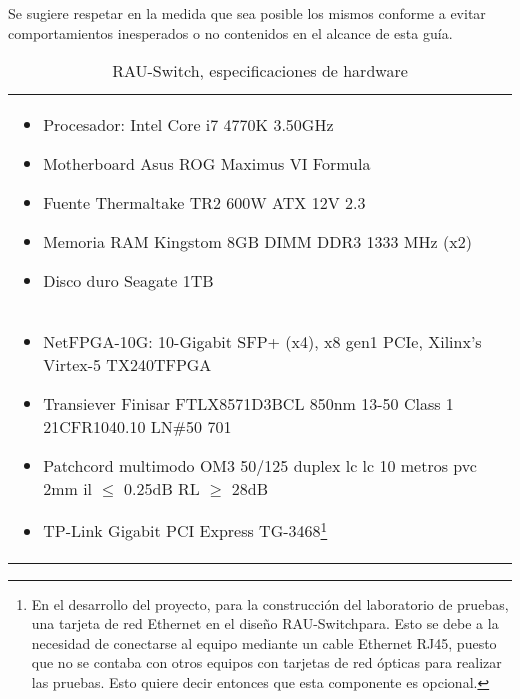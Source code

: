 Se sugiere respetar en la medida que sea posible los mismos conforme a evitar comportamientos inesperados o no contenidos en el alcance de esta guía.\\

\begin{table}[h]\centering
\begin{tabularx}{\textwidth}{|>{\setlength\hsize{1.0\hsize}\setlength\linewidth{\hsize}}X|}
\hline
\multicolumn{1}{|c|}{Hardware}\\
\hline
\begin{itemize}
\item Procesador: Intel Core i7 4770K 3.50GHz
\item Motherboard Asus ROG Maximus VI Formula
\item Fuente Thermaltake TR2 600W ATX 12V 2.3
\item Memoria RAM Kingstom 8GB DIMM DDR3 1333 MHz (x2)
\item Disco duro Seagate 1TB
\end{itemize}\\

\begin{itemize}
\item NetFPGA-10G: 10-Gigabit SFP+ (x4), x8 gen1 PCIe, Xilinx’s Virtex-5 TX240TFPGA
\item Transiever Finisar FTLX8571D3BCL 850nm 13-50
	  Class 1 21CFR1040.10 LN\#50 7\/01
\item Patchcord multimodo OM3 50/125 duplex lc lc 10 metros pvc 2mm
	  il $\leq$ 0.25dB RL $\geq$ 28dB
\item TP-Link Gigabit PCI Express TG-3468\footnote{En el desarrollo del proyecto, para la construcci\'on del laboratorio de pruebas, una tarjeta de red Ethernet en el diseño RAU-Switchpara. Esto se debe a la necesidad de conectarse al equipo mediante un cable Ethernet RJ45, puesto que no se contaba con otros equipos con tarjetas de red \'opticas para realizar las pruebas. Esto quiere decir entonces que esta componente es opcional.}
\end{itemize}\\
\hline
\end{tabularx}
\caption{RAU-Switch, especificaciones de hardware}
\label{table:RAUHSpecs}
\end{table}


